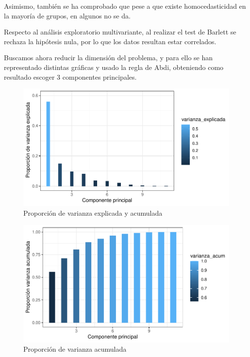 \documentclass[twoside,openright,titlepage,numbers=noenddot,openany,headinclude,footinclude=true,
cleardoublepage=empty,abstractoff,BCOR=5mm,paper=a4,fontsize=12pt,main=spanish]{scrreprt}
\begin{document}
Asimismo, también se ha comprobado que pese a que existe homocedasticidad en la mayoría de grupos, en algunos no se da.

Respecto al análisis exploratorio multivariante, al realizar el test de Barlett se rechaza la hipótesis nula, por lo que los datos resultan estar correlados.

Buscamos ahora reducir la dimensión del problema, y para ello se han representado distintas gráficas y usado la regla de Abdi, obteniendo como resultado escoger $3$ componentes principales.

\begin{figure}[H]
\includegraphics[scale=1]{varianza_explicada.pdf}
\caption{Proporción de varianza explicada y acumulada}
\label{fig: varianza_explicada}
\end{figure}

\begin{figure}[H]
\includegraphics[scale=1]{varianza_acumulada.pdf}
\caption{Proporción de varianza acumulada}
\label{fig: varianza_acumulada}
\end{figure}
\end{document}
